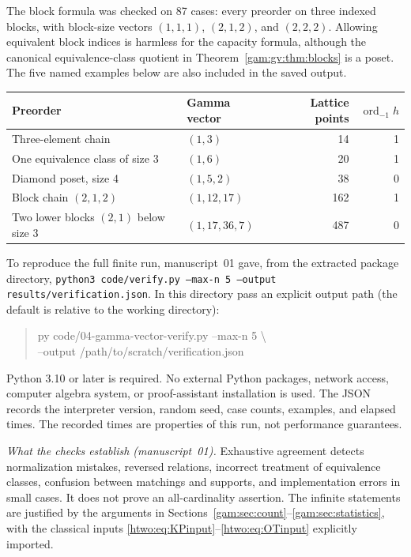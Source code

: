 \documentclass[11pt]{article}
\numberwithin{equation}{section}
\theoremstyle{definition}
\newcommand{\ordm}{\operatorname{ord}}
\begin{document}
The block formula was checked on 87 cases: every preorder on three
indexed blocks, with block-size vectors $(1,1,1)$, $(2,1,2)$, and $(2,2,2)$.
Allowing equivalent block indices is harmless for the capacity formula,
although the canonical equivalence-class quotient in
Theorem~\ref{gam:gv:thm:blocks} is a poset. The five named examples below are also
included in the saved output.

\begin{center}
\small
\begin{tabularx}{\textwidth}{@{}p{}Yrr@{}}
\toprule
Preorder & Gamma vector & Lattice points & $\ordm_{-1}h$\\
\midrule
Three-element chain & $(1,3)$ & 14 & 1\\
One equivalence class of size 3 & $(1,6)$ & 20 & 1\\
Diamond poset, size 4 & $(1,5,2)$ & 38 & 0\\
Block chain $(2,1,2)$ & $(1,12,17)$ & 162 & 1\\
Two lower blocks $(2,1)$ below size 3 & $(1,17,36,7)$ & 487 & 0\\
\bottomrule
\end{tabularx}
\end{center}

To reproduce the full finite run, manuscript~01 gave, from the extracted
package directory, \texttt{python3 code/verify.py --max-n 5 --output
results/verification.json}. In this directory pass an explicit output path
(the default is relative to the working directory):
\begin{quote}\small\ttfamily
py code/04-gamma-vector-verify.py --max-n 5 \textbackslash\\
\hspace*{2em}--output /path/to/scratch/verification.json
\end{quote}
Python 3.10 or later is required. No external Python packages, network
access, computer algebra system, or proof-assistant installation is used.
The JSON records the interpreter version, random seed, case counts,
examples, and elapsed times. The recorded times are properties of this run,
not performance guarantees.

\emph{What the checks establish (manuscript~01).} Exhaustive agreement
detects normalization mistakes, reversed relations, incorrect treatment of
equivalence classes, confusion between matchings and supports, and
implementation errors in small cases. It does not prove an all-cardinality
assertion. The infinite statements are justified by the arguments in
Sections~\ref{gam:sec:count}--\ref{gam:sec:statistics}, with the classical
inputs \eqref{htwo:eq:KPinput}--\eqref{htwo:eq:OTinput} explicitly imported.
\end{document}
